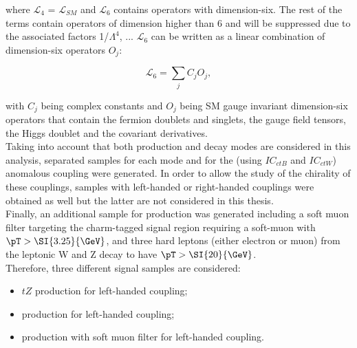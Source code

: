 \noindent where $\mathcal{L}_4$ = $\mathcal{L}_{SM}$ and $\mathcal{L}_6$ contains operators with dimension-six. The rest of the terms contain operators of dimension higher than 6 and will be suppressed due to the associated factors 1/$\Lambda^4$, ... $\mathcal{L}_6$ can be written as a linear combination of dimension-six operators $O_j$: 

\begin{equation}
\mathcal{L}_6 = \sum_j C_j O_j,
\end{equation}

\noindent with $C_j$ being complex constants and $O_j$ being SM gauge invariant dimension-six operators that contain the fermion doublets and singlets, the gauge field tensors, the Higgs doublet and the covariant derivatives.\\
Taking into account that both production and decay modes are considered in this analysis, separated samples for each mode and for the \tZc (using $IC_{ctB}$ and $IC_{ctW}$) anomalous coupling were generated. In order to allow the study of the chirality of these couplings, samples with left-handed or right-handed couplings were obtained as well but the latter are not considered in this thesis.\\ Finally, an additional sample for \ttbar production was generated including a soft muon filter targeting the charm-tagged signal region requiring a soft-muon with $\pT >\SI{3.25}{\GeV}$, and three hard leptons (either electron or muon) from the leptonic W and Z decay to have $\pT >\SI{20}{\GeV}$.\\
Therefore, three different signal samples are considered:
\begin{itemize}
	\item $tZ$ production for \tZc left-handed coupling; 
	\item \ttbar production for \tZc left-handed coupling; 
	\item \ttbar production with soft muon filter for \tZc left-handed coupling. 
\end{itemize}

